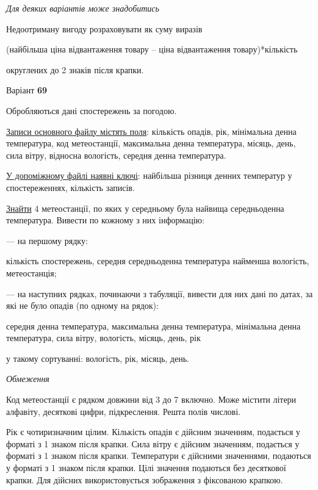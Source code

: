 \documentclass[11pt, ukrainian]{article}
\begin{document}
\bigskip\textit{Для деяких варіантів може знадобитись}

Недоотриману вигоду розраховувати як суму виразів
{\center (найбільша ціна відвантаження товару – ціна відвантаження товару)*кількість\par}

\bigskip
{\noindent} округлених до 2 знаків після крапки.




\par
\newpage
{\center Варіант  \No \textbf { 69 }\par}
\bigskip
Обробляються дані спостережень за погодою. 

\underline{Записи основного файлу містять поля}: кількість опадів, рік, мінімальна денна температура, код метеостанції, максимальна денна температура, місяць, день, сила вітру, відносна вологість, середня денна температура.

\underline{У допоміжному файлі наявні ключі}: найбільша різниця денних температур у спостереженнях, кількість записів.

\underline{Знайти} 4 метеостанції, по яких у середньому була найвища середньоденна температура. Вивести по кожному з них інформацію:\par
{\noindent}--- на першому рядку:\par
кількість спостережень, середня середньоденна температура найменша вологість, метеостанція;

{\noindent}--- на наступних рядках, починаючи з табуляції, вивести для них дані по датах, за які не було опадів (по одному на рядок):\par
середня денна температура, максимальна денна температура, мінімальна денна температура, сила вітру, вологість, місяць, день, рік

{\noindent}у такому сортуванні: вологість, рік, місяць, день.


\bigskip\textit{Обмеження}

Код метеостанції є рядком довжини від 3 до 7 включно.
Може містити літери алфавіту, десяткові цифри, підкреслення. Решта полів числові.

Рік є чотиризначним цілим.
Кількість опадів є дійсним значенням, подається у форматі з 1 знаком після крапки.
Сила вітру є дійсним значенням, подається у форматі з 1 знаком після крапки.
Температури є дійсними значеннями, подаються у форматі з 1 знаком після крапки.
Цілі значення подаються без десяткової крапки.
Для дійсних використовується зображення з фіксованою крапкою.
\end{document}
